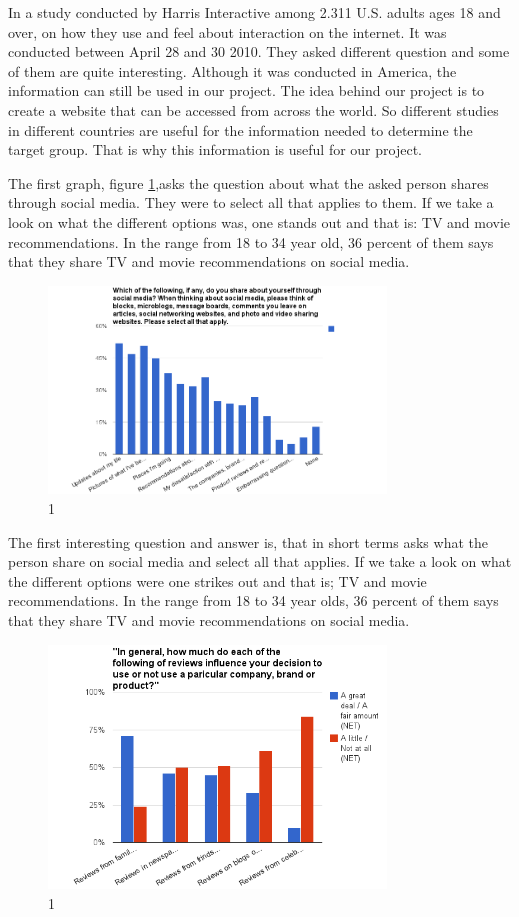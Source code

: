 In a study conducted by Harris Interactive \cite{Harris} among 2.311 U.S. adults ages 18 and over, on how they use and feel about interaction on the internet. It was conducted between April 28 and 30 2010. They asked different question and some of them are quite interesting.
Although it was conducted in America, the information can still be used in our project. The idea behind our project is to create a website that can be accessed from across the world. So different studies in different countries are useful for the information needed to determine the target group. That is why this information is useful for our project.

The first graph, figure \ref{Teori1},asks the question about what the asked person shares through social media. They were to select all that applies to them. If we take a look on what the different options was, one stands out and that is: TV and movie recommendations. In the range from 18 to 34 year old, 36 percent of them says that they share TV and movie recommendations on social media.

\begin{figure}[htb]
\centering
\includegraphics[width=0.8\textwidth]{Images/teori1.png}
\caption{1}
\label{Teori1}
\end{figure}

The first interesting question and answer is, that in short terms asks what the person share on social media and select all that applies. If we take a look on what the different options were one strikes out and that is; TV and movie recommendations. In the range from 18 to 34 year olds, 36 percent of them says that they share TV and movie recommendations on social media.

\begin{figure}[htb]
\centering
\includegraphics[width=0.8\textwidth]{Images/teori2.png}
\caption{1}
\label{Teori2}
\end{figure}

